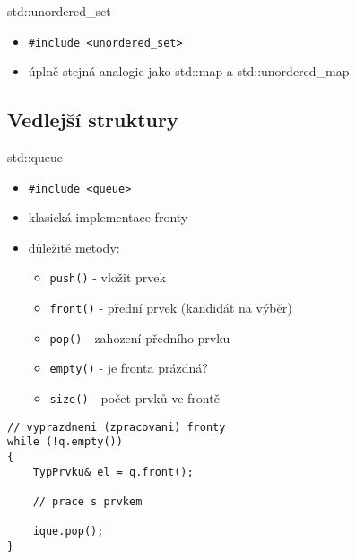 \documentclass{beamer}
\begin{document}
\begin{xframe}{std::unordered\_set}
	\begin{itemize}
		\item \texttt{\#include <unordered\_set>}
		\item úplně stejná analogie jako std::map a std::unordered\_map
	\end{itemize}
\end{xframe}

\subsection{Vedlejší struktury}

\begin{xframe}{std::queue}
	\begin{itemize}
		\item \texttt{\#include <queue>}
		\item klasická implementace fronty
		\item důležité metody:
			\begin{itemize}
				\item \texttt{push()} - vložit prvek
				\item \texttt{front()} - přední prvek (kandidát na výběr)
				\item \texttt{pop()} - zahození předního prvku
				\item \texttt{empty()} - je fronta prázdná?
				\item \texttt{size()} - počet prvků ve frontě
			\end{itemize}
	\end{itemize}			
\begin{lstlisting}[basicstyle=\fontsize{8}{9}\selectfont\ttfamily]
// vyprazdneni (zpracovani) fronty
while (!q.empty())
{
    TypPrvku& el = q.front();

    // prace s prvkem
    
    ique.pop();
}
\end{lstlisting}
\end{xframe}
\end{document}
